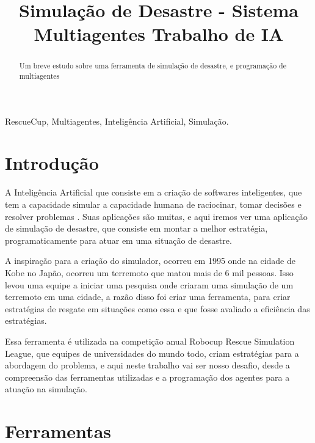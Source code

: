 \documentclass[conference]{IEEEtran}
\begin{document}
\title{Simulação de Desastre - Sistema Multiagentes  Trabalho de IA\\
}

\author{
}

\maketitle

\begin{abstract}
Um breve estudo sobre uma ferramenta de simulação de desastre, e programação de multiagentes
\end{abstract}

\begin{IEEEkeywords}
RescueCup, Multiagentes, Inteligência Artificial, Simulação.
\end{IEEEkeywords}

\section{Introdução}
A Inteligência Artificial que consiste em a criação de softwares inteligentes, que tem a capacidade simular a capacidade humana de raciocinar, tomar decisões e resolver problemas . Suas aplicações são muitas, e aqui iremos ver uma aplicação de simulação de desastre, que consiste em montar a melhor estratégia, programaticamente para atuar em uma situação de desastre.

A inspiração para a criação do simulador, ocorreu em 1995 onde na cidade de Kobe no Japão, ocorreu um terremoto que matou mais de 6 mil pessoas. Isso levou uma equipe a iniciar uma pesquisa onde criaram uma simulação de um terremoto em uma cidade, a razão disso foi criar uma ferramenta, para criar estratégias de resgate em situações como essa e que fosse avaliado a eficiência das estratégias. 

Essa ferramenta é utilizada na competição anual Robocup Rescue Simulation League, que equipes de universidades do mundo todo, criam estratégias para  a abordagem do problema, e aqui neste trabalho vai ser nosso desafio, desde a compreensão das ferramentas utilizadas e a programação dos agentes para a atuação na simulação.

\section{Ferramentas}
\end{document}
